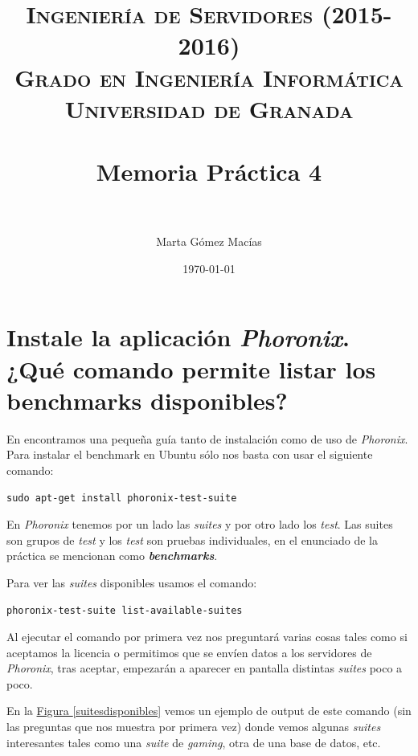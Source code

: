 \documentclass[10pt,a4paper,spanish]{article}
\title{
\normalfont \normalsize 
\textsc{{\bf Ingeniería de Servidores (2015-2016)} \\ Grado en Ingeniería Informática \\ Universidad de Granada} \\ [25pt] %
\horrule{0.5pt} \\[0.4cm] %
\huge Memoria Práctica 4 \\ %
\horrule{2pt} \\[0.5cm] %
}
\author{Marta Gómez Macías} %
\date{\normalsize\today} %
\numberwithin{equation}{section} %
\numberwithin{figure}{section} %
\numberwithin{table}{section} %
\begin{document}
\renewcommand{\listtablename}{Índice de tablas}

\maketitle %

\newpage %

\tableofcontents %

\listoffigures


\newpage

\section{Instale la aplicación \textit{Phoronix}. ¿Qué comando permite listar los benchmarks disponibles?}
En \cite{phoronixubuntu} encontramos una pequeña guía tanto de instalación como de uso de \textit{Phoronix}. Para instalar el benchmark en Ubuntu sólo nos basta con usar el siguiente comando:
\begin{verbatim}
sudo apt-get install phoronix-test-suite
\end{verbatim}

En \textit{Phoronix} tenemos por un lado las \textit{suites} y por otro lado los \textit{test}. Las suites son grupos de \textit{test} y los \textit{test} son pruebas individuales, en el enunciado de la práctica se mencionan como \textbf{\textit{benchmarks}}.

Para ver las \textit{suites} disponibles usamos el comando:
\begin{verbatim}
phoronix-test-suite list-available-suites
\end{verbatim}

Al ejecutar el comando por primera vez nos preguntará varias cosas tales como si aceptamos la licencia o permitimos que se envíen datos a los servidores de \textit{Phoronix}, tras aceptar, empezarán a aparecer en pantalla distintas \textit{suites} poco a poco. 

En la \hyperref[suitesdisponibles]{Figura \ref*{suitesdisponibles}} vemos un ejemplo de output de este comando (sin las preguntas que nos muestra por primera vez) donde vemos algunas \textit{suites} interesantes tales como una \textit{suite} de \textit{gaming}, otra de una base de datos, etc.
\end{document}
